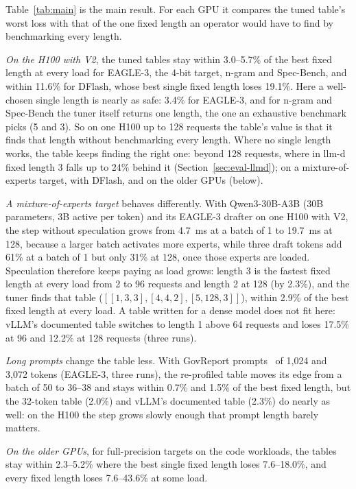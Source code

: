 \documentclass{article}
\begin{document}
Table~\ref{tab:main} is the main result. For each GPU it compares the tuned table's worst loss with that of the one fixed length an operator would have to find by benchmarking every length.

\emph{On the H100 with V2}, the tuned tables stay within 3.0--5.7\% of the best fixed length at every load for EAGLE-3, the 4-bit target, n-gram and Spec-Bench, and within 11.6\% for DFlash, whose best single fixed length loses 19.1\%. Here a well-chosen single length is nearly as safe: 3.4\% for EAGLE-3, and for n-gram and Spec-Bench the tuner itself returns one length, the one an exhaustive benchmark picks (5 and 3). So on one H100 up to 128 requests the table's value is that it finds that length without benchmarking every length. Where no single length works, the table keeps finding the right one: beyond 128 requests, where in llm-d fixed length 3 falls up to 24\% behind it (Section~\ref{sec:eval-llmd}); on a mixture-of-experts target, with DFlash, and on the older GPUs (below).

\emph{A mixture-of-experts target} behaves differently. With Qwen3-30B-A3B (30B parameters, 3B active per token) and its EAGLE-3 drafter on one H100 with V2, the step without speculation grows from 4.7~ms at a batch of 1 to 19.7~ms at 128, because a larger batch activates more experts, while three draft tokens add 61\% at a batch of 1 but only 31\% at 128, once those experts are loaded. Speculation therefore keeps paying as load grows: length 3 is the fastest fixed length at every load from 2 to 96 requests and length 2 at 128 (by 2.3\%), and the tuner finds that table ($[[1,3,3],[4,4,2],[5,128,3]]$), within 2.9\% of the best fixed length at every load. A table written for a dense model does not fit here: vLLM's documented table switches to length 1 above 64 requests and loses 17.5\% at 96 and 12.2\% at 128 requests (three runs).

\emph{Long prompts} change the table less. With GovReport prompts~\cite{huang2021govreport} of 1{,}024 and 3{,}072 tokens (EAGLE-3, three runs), the re-profiled table moves its edge from a batch of 50 to 36--38 and stays within 0.7\% and 1.5\% of the best fixed length, but the 32-token table (2.0\%) and vLLM's documented table (2.3\%) do nearly as well: on the H100 the step grows slowly enough that prompt length barely matters.

\emph{On the older GPUs}, for full-precision targets on the code workloads, the tables stay within 2.3--5.2\% where the best single fixed length loses 7.6--18.0\%, and every fixed length loses 7.6--43.6\% at some load.
\end{document}
